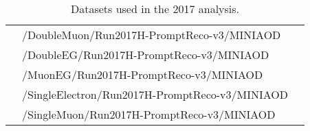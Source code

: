 \begin{table}[h]
\begin{tabular}{|l|l|l|}
 & /DoubleMuon/Run2017H-PromptReco-v3/MINIAOD &  \\
 & /DoubleEG/Run2017H-PromptReco-v3/MINIAOD &  \\
 & /MuonEG/Run2017H-PromptReco-v3/MINIAOD &  \\
 & /SingleElectron/Run2017H-PromptReco-v3/MINIAOD &  \\
 & /SingleMuon/Run2017H-PromptReco-v3/MINIAOD &  \\
\hline %
\hline %
     \end{tabular}
\small
    \caption{ Datasets used in the 2017 analysis. }
    \label{tab:datasets_2017}
\end{table}


